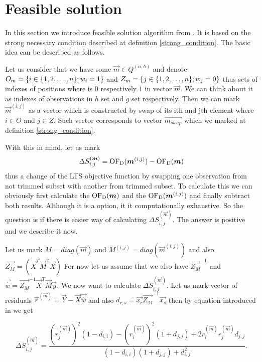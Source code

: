
\section{Feasible solution} \label{section_feasible_solution}
In this section we introduce feasible solution algorithm from \cite{hawkins:1994}.
It is based on the strong necessary condition described at definition \ref{strong_condition}. 
The basic idea can be described as follows.

Let us consider that we have some $\vec{m} \in Q^{(n,h)}$ and denote $O_m = \{{i \in  \{{  1,2,\ldots , n  \}} ;w_i = 1\}}$ and $Z_m = \{{j \in  \{{  1,2,\ldots , n  \}} ;w_j = 0\}}$ thus sets of indexes of positions where is $0$ respectively $1$ in vector $\vec{m}$. We can think about it as indexes of observations in $h$ set and $g$ set respectively. Then we can mark $\vec{m}^{(i,j)}$ as a vector which is constructed by swap of its ith and jth element where $i \in O$ and $j \in Z$. Such vector corresponds to vector $\vec{m_{swap}}$ which we marked at definition \ref{strong_condition}.

With this in mind, let us mark 
\begin{equation}
    \Delta S^{(\boldsymbol{m})}_{i,j} = \operatorname{OF_D}(\boldsymbol{m}^{(i,j)}) - \operatorname{OF_D}(\boldsymbol{m})
\end{equation}
thus a change of the LTS objective function by swapping one observation from not trimmed subset with another from trimmed subset. To calculate this we can obviously first calculate the  $\operatorname{OF_D}(\boldsymbol{m})$ and  the $ \operatorname{OF_D}(\boldsymbol{m}^{(i,j)})$ and finally subtract both results. Although it is a option, it it computationally exhaustive. So the question is if there is easier way of calculating $\Delta S^{(\vec{m})}_{i,j}$. The answer is positive and we describe it now.

Let us mark  
$M = diag(\vec{m})$ and 
$M^{(i,j)} = diag(\vec{m}^{(i,j)})$ and also
$\vec{Z_M} = (\vec{X}^T\vec{M}^T\vec{X})$
For now let us assume that we also have
$\vec{Z_M}^{-1}$ and $\vec{\hat{w}} = \vec{Z_M}^{-1}\vec{X}^T\vec{M}\vec{y}$.
We now want to calculate $\Delta S^{(\vec{m})}_{i,j}$.
Let us mark vector of residuals 
$\vec{r}^{(\vec{m})} = \vec{Y} - \vec{X} \vec{\hat{w}} $
and also $d_{r,s} = \vec{x_r} \vec{Z_M}^{-1}  \vec{x_s} $
then by equation introduced in \cite{atkinson1991simulated} we get

\begin{equation} \label{hawkins:rovnice}
    \Delta S^{(\vec{m})}_{i,j} = 
    \frac{({r}^{(\vec{m})}_{j})^2(1-d_{i,i})- ({r}^{(\vec{m})}_{i})^2(1+d_{j,j}) + 2{r}^{(\vec{m})}_{i}{r}^{(\vec{m})}_{j}d_{j,j}}
    {(1-d_{i,i})(1+d_{j,j}) + d_{i,j}^2}.
\end{equation}

